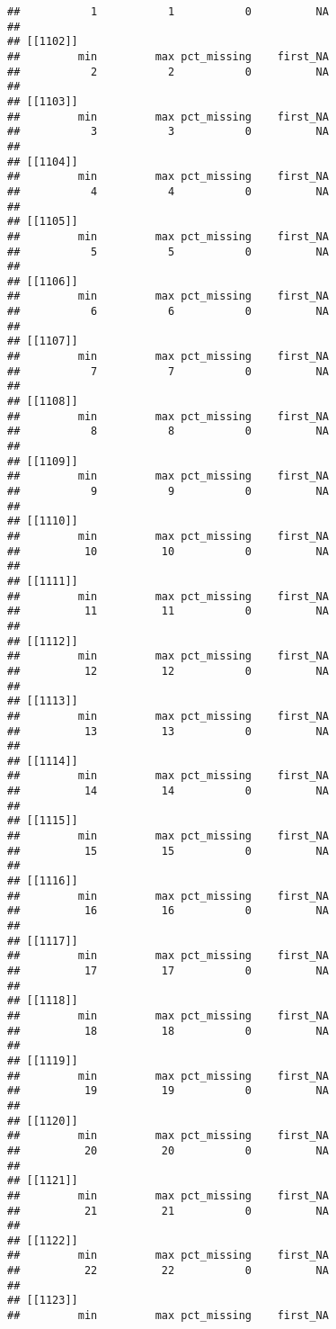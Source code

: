 \documentclass[
]{article}
\begin{document}
\begin{verbatim}
##           1           1           0          NA 
## 
## [[1102]]
##         min         max pct_missing    first_NA 
##           2           2           0          NA 
## 
## [[1103]]
##         min         max pct_missing    first_NA 
##           3           3           0          NA 
## 
## [[1104]]
##         min         max pct_missing    first_NA 
##           4           4           0          NA 
## 
## [[1105]]
##         min         max pct_missing    first_NA 
##           5           5           0          NA 
## 
## [[1106]]
##         min         max pct_missing    first_NA 
##           6           6           0          NA 
## 
## [[1107]]
##         min         max pct_missing    first_NA 
##           7           7           0          NA 
## 
## [[1108]]
##         min         max pct_missing    first_NA 
##           8           8           0          NA 
## 
## [[1109]]
##         min         max pct_missing    first_NA 
##           9           9           0          NA 
## 
## [[1110]]
##         min         max pct_missing    first_NA 
##          10          10           0          NA 
## 
## [[1111]]
##         min         max pct_missing    first_NA 
##          11          11           0          NA 
## 
## [[1112]]
##         min         max pct_missing    first_NA 
##          12          12           0          NA 
## 
## [[1113]]
##         min         max pct_missing    first_NA 
##          13          13           0          NA 
## 
## [[1114]]
##         min         max pct_missing    first_NA 
##          14          14           0          NA 
## 
## [[1115]]
##         min         max pct_missing    first_NA 
##          15          15           0          NA 
## 
## [[1116]]
##         min         max pct_missing    first_NA 
##          16          16           0          NA 
## 
## [[1117]]
##         min         max pct_missing    first_NA 
##          17          17           0          NA 
## 
## [[1118]]
##         min         max pct_missing    first_NA 
##          18          18           0          NA 
## 
## [[1119]]
##         min         max pct_missing    first_NA 
##          19          19           0          NA 
## 
## [[1120]]
##         min         max pct_missing    first_NA 
##          20          20           0          NA 
## 
## [[1121]]
##         min         max pct_missing    first_NA 
##          21          21           0          NA 
## 
## [[1122]]
##         min         max pct_missing    first_NA 
##          22          22           0          NA 
## 
## [[1123]]
##         min         max pct_missing    first_NA 

\end{verbatim}
\end{document}
